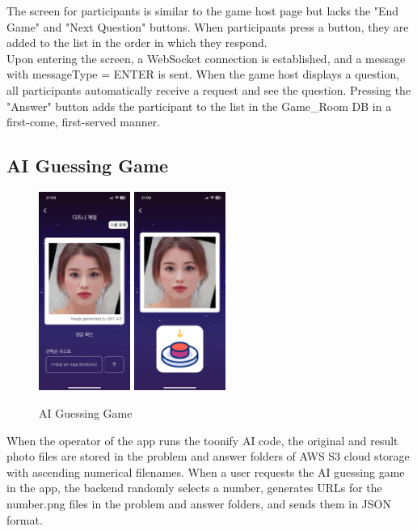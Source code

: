 \documentclass[conference]{IEEEtran}
\begin{document}
        The screen for participants is similar to the game host page but lacks the "End Game" and "Next Question" buttons. When participants press a button, they are added to the list in the order in which they respond. \\
    	Upon entering the screen, a WebSocket connection is established, and a message with messageType = ENTER is sent. When the game host displays a question, all participants automatically receive a request and see the question. Pressing the "Answer" button adds the participant to the list in the Game\_Room DB in a first-come, first-served manner.

    \subsection{AI Guessing Game}
        \begin{figure}[htbp]
            \centerline{\includegraphics[width=3cm]{Images/screen/game/disney/DISNEY2_HOST.PNG}
            \includegraphics[width=3cm]{Images/screen/game/disney/DISNEY2_PLAYER.PNG}}
            \caption{AI Guessing Game}
            \label{fig}
        \end{figure}
        When the operator of the app runs the toonify AI code, the original and result photo files are stored in the problem and answer folders of AWS S3 cloud storage with ascending numerical filenames. When a user requests the AI guessing game in the app, the backend randomly selects a number, generates URLs for the number.png files in the problem and answer folders, and sends them in JSON format.\\
\end{document}

